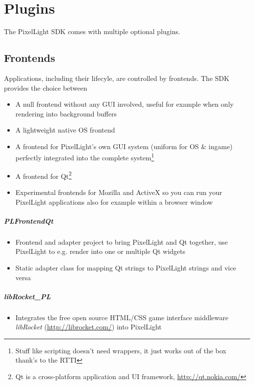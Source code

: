 \chapter{Plugins}
The PixelLight \ac{SDK} comes with multiple optional plugins.




\section{Frontends}
Applications, including their lifecyle, are controlled by frontends. The \ac{SDK} provides the choice between
\begin{itemize}
\item{A null frontend without any \ac{GUI} involved, useful for example when only rendering into background buffers}
\item{A lightweight native \ac{OS} frontend}
\item{A frontend for PixelLight's own \ac{GUI} system (uniform for \ac{OS} \& ingame) perfectly integrated into the complete system\footnote{Stuff like scripting doesn't need wrappers, it just works out of the box thank's to the \ac{RTTI}}}
\item{A frontend for Qt\footnote{Qt is a cross-platform application and \ac{UI} framework, \url{http://qt.nokia.com/}}}
\item{Experimental frontends for Mozilla and ActiveX so you can run your PixelLight applications also for example within a browser window}
\end{itemize}


\paragraph{PLFrontendQt}
\begin{itemize}
\item{Frontend and adapter project to bring PixelLight and Qt together, use PixelLight to e.g. render into one or multiple Qt widgets}
\item{Static adapter class for mapping Qt strings to PixelLight strings and vice versa}
\end{itemize}


\paragraph{libRocket\_PL}
\begin{itemize}
\item{Integrates the free open source \ac{HTML}/\ac{CSS} game interface middleware \emph{libRocket} (\url{http://librocket.com/}) into PixelLight}
\end{itemize}




